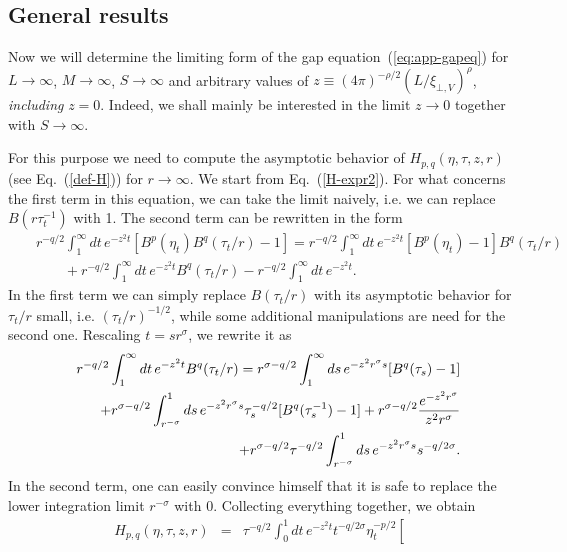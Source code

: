 \documentclass[a4paper,12pt]{article}
\begin{document}
{\subsection{General results} \label{AppC.1}


Now we will determine the limiting form of the gap
equation~(\ref{eq:app-gapeq}) for $L \to \infty$, $M \to \infty$,
$S \to \infty$ and arbitrary values of 
$z \equiv (4\pi)^{-\rho/2} (L/\xi_{\bot,V})^\rho$, {\em including}
$z = 0$. Indeed, we shall mainly be interested in the limit $z\to 0$
together with $S\to \infty$.

For this purpose we need to compute the asymptotic behavior of
$H_{p,q}(\eta,\tau,z,r)$ (see Eq.~(\ref{def-H})) 
for $r\to\infty$. We start from Eq.~(\ref{H-expr2}).
For what concerns the first term in this equation, we can take the limit
naively, i.e. we can replace $B(r\tau_t^{-1})$ with 1. The second term
can be rewritten in the form 
\begin{eqnarray}
&& r^{-q/2} \int_1^\infty dt\, e^{-z^2 t}
   [ B^p(\eta_t) B^q(\tau_t/r) - 1] =
   r^{-q/2} \int_1^\infty dt\, e^{-z^2 t}
   [ B^p(\eta_t) -1] B^q(\tau_t/r)
\nonumber \\
&& \qquad + r^{-q/2} \int_1^\infty dt\, e^{-z^2 t}  B^q(\tau_t/r) -
             r^{-q/2} \int_1^\infty dt\, e^{-z^2 t}.
\end{eqnarray}
In the first term we can simply replace $B(\tau_t/r)$ with its
asymptotic behavior for $\tau_t/r$ small, i.e. $(\tau_t/r)^{-1/2}$, 
while some additional
manipulations are need for the second one. Rescaling
$t = s r^\sigma$, we rewrite it as
\begin{eqnarray}
&& r^{-q/2} \int_1^\infty dt\, e^{-z^2 t}  B^q(\tau_t/r) =
    r^{\sigma-q/2} \int_1^\infty ds\, e^{-z^2 r^\sigma s} [ B^q(\tau_s) 
- 1]
\nonumber  \\
&& \qquad + r^{\sigma-q/2} \int_{r^{-\sigma}}^1 ds\, e^{-z^2 r^\sigma s}
    \tau_s^{-q/2} [ B^q(\tau_s^{-1}) - 1] +
    r^{\sigma-q/2} {e^{-z^2 r^\sigma} \over z^2 r^\sigma}
\nonumber  \\
&& \qquad + r^{\sigma-q/2} \tau^{-q/2}
    \int_{r^{-\sigma}}^1 ds\, e^{-z^2 r^\sigma s} s^{-q/2\sigma}.
\end{eqnarray}
In the second term, one can easily convince himself that it is safe to
replace the lower integration limit $r^{-\sigma}$ with 0.
Collecting everything together, we obtain
\begin{eqnarray}
H_{p,q}(\eta,\tau,z,r) &=&
\tau^{-q/2}  \int_0^1 dt\, e^{-z^2 t} t^{-q/2\sigma} \eta_t^{-p/2} 
\left[

\end{eqnarray}}
\end{document}
